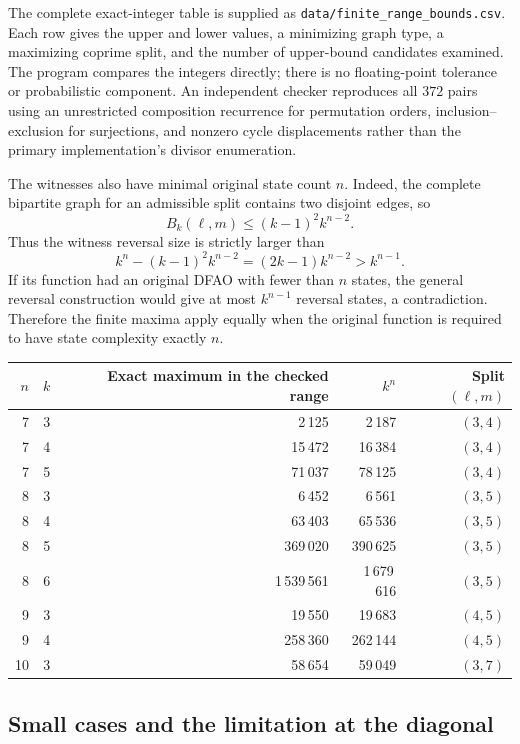 \documentclass[11pt,a4paper]{article}
\numberwithin{equation}{section}
\theoremstyle{definition}
\theoremstyle{remark}
\begin{document}
The complete exact-integer table is supplied as
\texttt{data/finite\_range\_bounds.csv}. Each row gives the upper and lower
values, a minimizing graph type, a maximizing coprime split, and the number
of upper-bound candidates examined. The program compares the integers
directly; there is no floating-point tolerance or probabilistic component.
An independent checker reproduces all $372$ pairs using an unrestricted
composition recurrence for permutation orders, inclusion--exclusion for
surjections, and nonzero cycle displacements rather than the primary
implementation's divisor enumeration.

The witnesses also have minimal original state count $n$. Indeed, the
complete bipartite graph for an admissible split contains two disjoint
edges, so
\[
 B_k(\ell,m)\le(k-1)^2k^{n-2}.
\]
Thus the witness reversal size is strictly larger than
\[
 k^n-(k-1)^2k^{n-2}=(2k-1)k^{n-2}>k^{n-1}.
\]
If its function had an original DFAO with fewer than $n$ states, the general
reversal construction would give at most $k^{n-1}$ reversal states, a
contradiction. Therefore the finite maxima apply equally when the original
function is required to have state complexity exactly $n$.

\begin{center}
\begin{tabular}{@{}rrrrr@{}}
\toprule
$n$ & $k$ & Exact maximum in the checked range & $k^n$ & Split $(\ell,m)$\\
\midrule
7 & 3 & 2\,125 & 2\,187 & $(3,4)$\\
7 & 4 & 15\,472 & 16\,384 & $(3,4)$\\
7 & 5 & 71\,037 & 78\,125 & $(3,4)$\\
8 & 3 & 6\,452 & 6\,561 & $(3,5)$\\
8 & 4 & 63\,403 & 65\,536 & $(3,5)$\\
8 & 5 & 369\,020 & 390\,625 & $(3,5)$\\
8 & 6 & 1\,539\,561 & 1\,679\,616 & $(3,5)$\\
9 & 3 & 19\,550 & 19\,683 & $(4,5)$\\
9 & 4 & 258\,360 & 262\,144 & $(4,5)$\\
10 & 3 & 58\,654 & 59\,049 & $(3,7)$\\
\bottomrule
\end{tabular}
\end{center}

\subsection{Small cases and the limitation at the diagonal}
\end{document}
